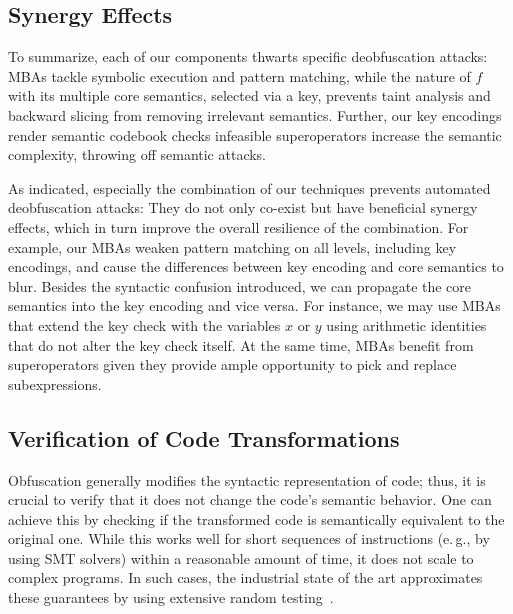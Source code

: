 \documentclass[letterpaper,twocolumn,10pt]{article}
\newcommand{\eg}{e.\,g.,\xspace}
\theoremstyle{customexample}
\theoremstyle{customexperiment}
\begin{document}
\subsection{Synergy Effects}
To summarize, each of our components thwarts specific deobfuscation attacks: MBAs tackle symbolic execution and pattern matching, while the nature of $f$ with its multiple core semantics, selected via a key, prevents taint analysis and backward slicing from removing irrelevant semantics. Further, our key encodings render semantic codebook checks infeasible superoperators increase the semantic complexity, throwing off semantic attacks.

As indicated, especially the combination of our techniques prevents automated deobfuscation attacks: They do not only co-exist but have beneficial synergy effects, which in turn improve the overall resilience of the combination. For example, our MBAs weaken pattern matching on all levels, including key encodings, and cause the differences between key encoding and core semantics to blur. Besides the syntactic confusion introduced, we can propagate the core semantics into the key encoding and vice versa. For instance, we may use MBAs that extend the key check with the variables $x$ or $y$ using arithmetic identities that do not alter the key check itself.
At the same time, MBAs benefit from superoperators given they provide ample opportunity to pick and replace subexpressions.

\subsection{Verification of Code Transformations}



Obfuscation generally modifies the syntactic representation of code; thus, it is crucial to verify that it does not change the code's semantic behavior. One can achieve this by checking if the transformed code is semantically equivalent to the original one. While this works well for short sequences of instructions (\eg by using SMT solvers) within a reasonable amount of time, it does not scale to complex programs. In such cases, the industrial state of the art approximates these guarantees by using extensive random testing~\cite{afl,klees2018evalfuzz}.
\end{document}
